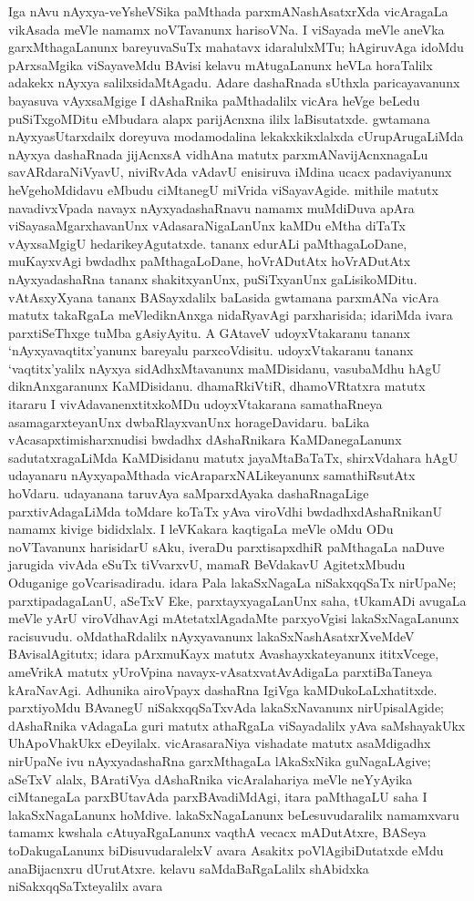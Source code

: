 Iga nAvu nAyxya-veYsheVSika paMthada parxmANashAsatxrXda vicAragaLa vikAsada meVle namamx noVTavanunx harisoVNa. I viSayada meVle aneVka garxMthagaLanunx bareyuvaSuTx mahatavx idaralulxMTu; hAgiruvAga idoMdu pArxsaMgika viSaya\-veMdu BAvisi kelavu mAtugaLanunx heVLa horaTalilx adakekx nAyxya salilxsi\-daMtAgadu. Adare dashaRnada sUthxla paricayavanunx bayasuva vAyxsaMgige I dAshaRnika paMtha\-dalilx vicAra heVge beLedu puSiTxgoMDitu eMbudara alapx parijAcnxna ililx laBisutatxde. gwtamana nAyxyasUtarxdailx doreyuva modamodalina lekakxkikxlalxda cUrupAru\-gaLiMda nAyxya dashaRnada jijAcnxsA vidhAna matutx parxmANavijAcnxnagaLu savAR\-dara\-NiVyavU, niviRvAda vAdavU enisiruva iMdina ucacx padaviyanunx heVge\break hoMdi\-davu eMbudu ciMtanegU miVrida viSayavAgide. mithile matutx nava\-divxVpada navayx nAyxyadashaRnavu namamx muMdiDuva apAra viSayasaMgarxhavanUnx vAdasaraNigaLanUnx kaMDu eMtha diTaTx vAyxsaMgigU hedarikeyAgutatxde. tananx edu\-rALi paMthagaLoDane, muKayxvAgi bwdadhx paMthagaLoDane, hoVrA\-DutAtx hoVrA\-DutAtx nAyxyadashaRna tananx shakitxyanUnx, puSiTxyanUnx gaLisikoMDitu. vAtAsxyXyana tananx BASayxdalilx baLasida gwtamana parxmANa vicAra matutx takaRgaLa meVle\break diknAnxga nidaRyavAgi parxharisida; idariMda ivara parxtiSeThxge tuMba gAsi\-yAyitu. A GAtaveV udoyxVtakaranu tananx `nAyxyavaqtitx'yanunx bareyalu parxcoVdisitu. udoyxVtakaranu tananx `vaqtitx'yalilx nAyxya sidAdhxMtavanunx maMDisidanu, vasubaMdhu hAgU diknAnxgaranunx KaMDisidanu. dhamaRkiVtiR, dhamoVRtatxra matutx itararu I vivAdavanenxtitxkoMDu udoyxVtakarana samathaRneya asamagarxteyanUnx dwbaRlayx\-vanUnx horageDavidaru. baLika vAcasapxtimisharxnudisi bwdadhx dAshaRnikara KaMDane\-gaLanunx sadutatxragaLiMda KaMDisidanu matutx jayaMtaBaTaTx, shirxVdahara hAgU udayanaru nAyxyapaMthada vicAraparxNALikeyanunx samathiRsutAtx hoVdaru. udayanana taruvAya saMparxdAyaka dashaRnagaLige parxtivAdagaLiMda toMdare koTaTx yAva viroVdhi bwdadhxdAshaRnikanU namamx kivige bididxlalx. I leVKakara kaqtigaLa meVle oMdu ODu noVTavanunx harisidarU sAku, iveraDu parxtisapxdhiR paMthagaLa naDuve jarugida vivAda eSuTx tiVvarxvU, mamaR BeVdakavU AgitetxMbudu Oduganige goVcarisadiradu. idara Pala lakaSxNagaLa niSakxqqSaTx nirUpaNe; parxtipadagaLanU, aSeTxV Eke, parxtayxyagaLanUnx saha, tUkamADi avugaLa meVle yArU viroVdhavAgi mAtetatxlAgadaMte parxyoVgisi lakaSxNagaLanunx racisuvudu. oMdathaRdalilx nAyxyavanunx lakaSxNashAsatxrXveMdeV BAvisalAgitutx; idara pArxmuKayx matutx Avashayxkateyanunx ititxVcege, ameVrikA matutx yUroVpina navayx-vAsatxvatAvAdigaLa parxtiBaTaneya kAraNavAgi. Adhunika airoVpayx dashaRna IgiVga kaMDukoLaLxhatitxde. parxtiyoMdu BAvanegU niSakxqqSaTxvAda lakaSxNavanunx nirUpisalAgide; dAshaRnika vAdagaLa guri matutx athaRgaLa viSayadalilx yAva saMshayakUkx UhApoVhakUkx eDeyilalx. vicArasaraNiya vishadate matutx asaMdigadhx nirUpaNe ivu nAyxyadashaRna garxMthagaLa lAkaSxNika guNagaLAgive; aSeTxV alalx, BAratiVya dAshaRnika vicAralahariya meVle neYyAyika ciMtanegaLa parxBUtavAda parxBAvadiMdAgi, itara paMthagaLU saha I lakaSxNagaLanunx hoMdive. lakaSxNagaLanunx beLesuvudaralilx namamxvaru tamamx kwshala cAtuyaRgaLanunx vaqthA vecacx mADutAtxre, BASeya toDakugaLanunx biDisuvudaralelxV avara Asakitx poVlAgibiDutatxde eMdu anaBijacnxru dUrutAtxre. kelavu saMdaBaRgaLalilx shAbidxka niSakxqqSaTxteyalilx avara 